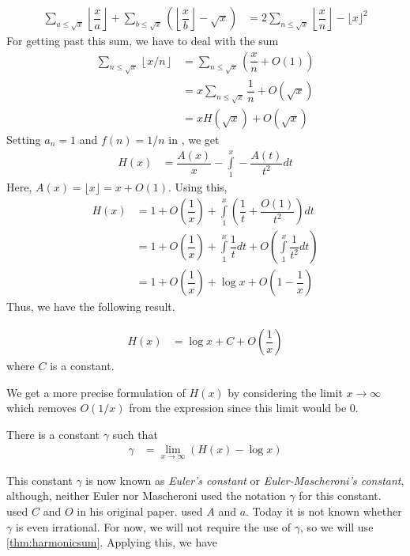 \documentclass[elemannt.tex]{subfile}
\begin{document}
		\begin{align}
			\sum_{a\leq \sqrt{x}}\left\lfloor{\dfrac{x}{a}}\right\rfloor+\sum_{b\leq \sqrt{x}}\left(\left\lfloor{\dfrac{x}{b}}\right\rfloor-\sqrt{x}\right)
				& = 2\sum_{n\leq \sqrt{x}}\left\lfloor{\dfrac{x}{n}}\right\rfloor-\lfloor{x}\rfloor^{2}\label{eqn:totdiv}
		\end{align}
	For getting past this sum, we have to deal with the sum
		\begin{align*}
			\sum_{n\leq \sqrt{x}}\left\lfloor{x/n}\right\rfloor
				& = \sum_{n\leq \sqrt{x}}\left(\dfrac{x}{n}+O(1)\right)\\
				& = x\sum_{n\leq \sqrt{x}}\dfrac{1}{n}+O(\sqrt{x})\\
				& = xH(\sqrt{x})+O(\sqrt{x})
		\end{align*}
	Setting $a_{n}=1$ and $f(n)=1/n$ in , we get
		\begin{align*}
			H(x)
				& = \dfrac{A(x)}{x}-\int\limits_{1}^{x}-\dfrac{A(t)}{t^{2}}dt
		\end{align*}
	Here, $A(x)=\lfloor{x}\rfloor=x+O(1)$. Using this,
		\begin{align*}
			H(x)
				& =  1+O\left(\dfrac{1}{x}\right)+\int\limits_{1}^{x}\left(\dfrac{1}{t}+\dfrac{O(1)}{t^{2}}\right)dt\\
				& = 1+O\left(\dfrac{1}{x}\right)+\int\limits_{1}^{x}\dfrac{1}{t}dt+O\left(\int\limits_{1}^{x}\dfrac{1}{t^{2}}dt\right)\\
				& = 1+O\left(\dfrac{1}{x}\right)+\log{x}+O\left(1-\dfrac{1}{x}\right)
		\end{align*}
	Thus, we have the following result.
		\begin{theorem}\label{thm:harmonicsum}
				\begin{align*}
					H(x)
						& = \log{x}+C+O\left(\dfrac{1}{x}\right)
				\end{align*}
			where $C$ is a constant.
		\end{theorem}
	We get a more precise formulation of $H(x)$ by considering the limit $x\to\infty$ which removes $O(1/x)$ from the expression since this limit would be $0$.
		\begin{theorem}
			There is a constant $\gamma$ such that
				\begin{align*}
					\gamma
						& = \lim\limits_{x\to\infty}(H(x)-\log{x})
				\end{align*}
		\end{theorem}
	This constant $\gamma$ is now known as \textit{Euler's constant} or \textit{Euler-Mascheroni's constant}, although, neither Euler nor Mascheroni used the notation $\gamma$ for this constant. \textcite{euler_2020} used $C$ and $O$ in his original paper. \textcite{mascheroni_1790} used $A$ and $a$. Today it is not known whether $\gamma$ is even irrational. For now, we will not require the use of $\gamma$, so we will use \autoref{thm:harmonicsum}. Applying this, we have
\end{document}
